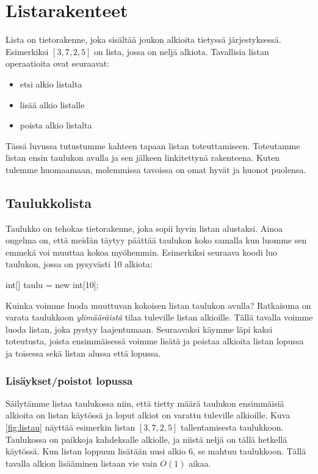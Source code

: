 \chapter{Listarakenteet}

Lista on tietorakenne, joka sisältää joukon alkioita tietyssä järjestyksessä.
Esimerkiksi $[3,7,2,5]$ on lista, jossa on neljä alkiota.
Tavallisia listan operaatioita ovat seuraavat:

\begin{itemize}
\item etsi alkio listalta
\item lisää alkio listalle
\item poista alkio listalta
\end{itemize}

Tässä luvussa tutustumme kahteen tapaan listan toteuttamiseen.
Toteutamme listan ensin taulukon avulla ja sen jälkeen
linkitettynä rakenteena.
Kuten tulemme huomaamaan, molemmissa tavoissa on omat
hyvät ja huonot puolensa.

\section{Taulukkolista}

Taulukko on tehokas tietorakenne, joka sopii hyvin listan alustaksi.
Ainoa ongelma on, että meidän täytyy päättää taulukon koko
samalla kun luomme sen emmekä voi muuttaa kokoa myöhemmin.
Esimerkiksi seuraava koodi luo taulukon, jossa on pysyvästi 10 alkiota:

\begin{code}
int[] taulu = new int[10];
\end{code}

Kuinka voimme luoda muuttuvan kokoisen listan taulukon avulla?
Ratkaisuna on varata taulukkoon \emph{ylimääräistä}
tilaa tuleville listan alkioille.
Tällä tavalla voimme luoda listan, joka pystyy laajentumaan.
Seuraavaksi käymme läpi kaksi toteutusta,
joista ensimmäisessä voimme lisätä ja poistaa alkioita
listan lopussa ja toisessa sekä listan alussa että lopussa.

\subsection{Lisäykset/poistot lopussa}

Säilytämme listaa taulukossa niin,
että tietty määrä taulukon ensimmäisiä alkioita on listan käytössä
ja loput alkiot on varattu tuleville alkioille.
Kuva \ref{fig:listau} näyttää esimerkin listan $[3,7,2,5]$ tallentamisesta taulukkoon.
Taulukossa on paikkoja kahdeksalle alkiolle, ja niistä neljä on tällä hetkellä käytössä.
Kun listan loppuun lisätään uusi alkio 6, se mahtuu taulukkoon.
Tällä tavalla alkion lisääminen listaan vie vain $O(1)$ aikaa.

